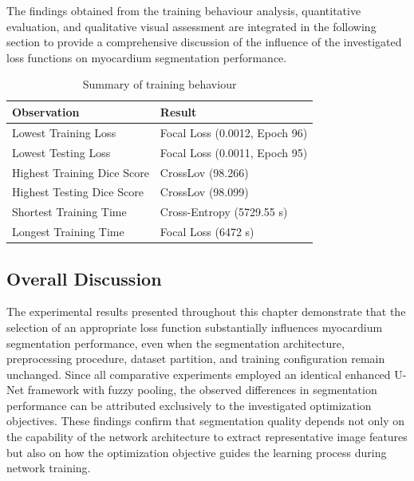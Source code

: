The findings obtained from the training behaviour analysis, quantitative evaluation, and qualitative visual assessment are integrated in the following section to provide a comprehensive discussion of the influence of the investigated loss functions on myocardium segmentation performance.

\begin{table}[htbp]
	\centering
	\caption{Summary of training behaviour}
	\label{tab:ch5-training-behaviour}
	
	\small
	\setlength{\heavyrulewidth}{\lightrulewidth}
	\renewcommand{\arraystretch}{1.3}
	\begin{tabularx}{\textwidth}{
			>{\raggedright\arraybackslash}p{}
			>{\raggedright\arraybackslash}X
		}
		\toprule
		\textbf{Observation} & \textbf{Result} \\
		\midrule
		Lowest Training Loss & Focal Loss (0.0012, Epoch 96) \\
		Lowest Testing Loss & Focal Loss (0.0011, Epoch 95) \\
		Highest Training Dice Score & CrossLov (98.266) \\
		Highest Testing Dice Score & CrossLov (98.099) \\
		Shortest Training Time & Cross-Entropy (5729.55 s) \\
		Longest Training Time & Focal Loss (6472 s) \\
		\bottomrule
	\end{tabularx}
\end{table}

\subsection{Overall Discussion}
\label{subsec:ch5-discussion}  

The experimental results presented throughout this chapter demonstrate that the selection of an appropriate loss function substantially influences myocardium segmentation performance, even when the segmentation architecture, preprocessing procedure, dataset partition, and training configuration remain unchanged. Since all comparative experiments employed an identical enhanced U-Net framework with fuzzy pooling, the observed differences in segmentation performance can be attributed exclusively to the investigated optimization objectives. These findings confirm that segmentation quality depends not only on the capability of the network architecture to extract representative image features but also on how the optimization objective guides the learning process during network training.

